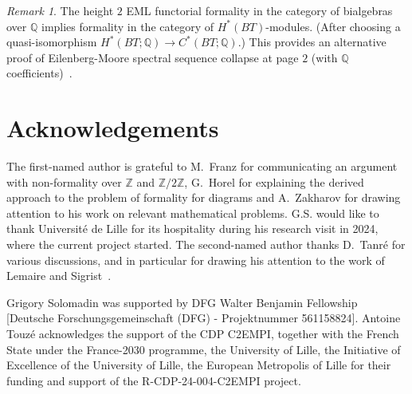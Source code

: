 \documentclass{amsart}
\theoremstyle{definition}
\theoremstyle{remark}
\newtheorem{remark}[formula]{Remark}
\newcommand{\Z}{\mathbb Z}
\newcommand{\Q}{\mathbb Q}
\begin{document}
\begin{remark}
	The height $2$ EML functorial formality in the category of bialgebras over $\Q$ implies formality in the category of $H^*(BT)$-modules.
	(After choosing a quasi-isomorphism $H^{*}(BT;\Q)\to C^*(BT;\Q)$.)
	This provides an alternative proof of Eilenberg-Moore spectral sequence collapse at page $2$ (with $\Q$ coefficients)~\cite[Theorem~4.22]{li-so-22}.
\end{remark}

\section{Acknowledgements}
The first-named author is grateful to M.~Franz for communicating an argument with non-formality over $\Z$ and $\Z/2\Z$, G.~Horel for explaining the derived approach to the problem of formality for diagrams and A.~Zakharov for drawing attention to his work on relevant mathematical problems.
G.S. would like to thank Universit\'e de Lille for its hospitality during his research visit in 2024, where the current project started.
The second-named author thanks D.~Tanr\'e for various discussions, and in particular for drawing his attention to the work of Lemaire and Sigrist~\cite{le-si-81}.

Grigory Solomadin was supported by DFG Walter Benjamin Fellowship [Deutsche Forschungsgemeinschaft (DFG) - Projektnummer 561158824].
Antoine Touz\'e acknowledges the support of the CDP C2EMPI, together with the French State under the France-2030 programme, the University of Lille, the Initiative of Excellence of the University of Lille, the European Metropolis of Lille for their funding and support of the R-CDP-24-004-C2EMPI project. 


\begin{bibdiv}
	\begin{biblist}[\resetbiblist{99}]
	\end{biblist}
\end{bibdiv}
\end{document}
